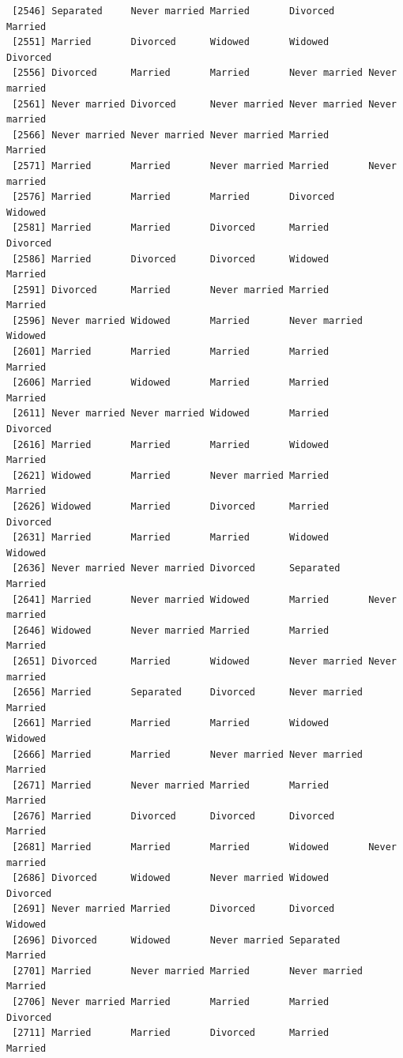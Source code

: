 \documentclass[
  letterpaper,
  DIV=11,
  numbers=noendperiod,
  oneside]{scrartcl}
\begin{document}
\begin{verbatim}
 [2546] Separated     Never married Married       Divorced      Married      
 [2551] Married       Divorced      Widowed       Widowed       Divorced     
 [2556] Divorced      Married       Married       Never married Never married
 [2561] Never married Divorced      Never married Never married Never married
 [2566] Never married Never married Never married Married       Married      
 [2571] Married       Married       Never married Married       Never married
 [2576] Married       Married       Married       Divorced      Widowed      
 [2581] Married       Married       Divorced      Married       Divorced     
 [2586] Married       Divorced      Divorced      Widowed       Married      
 [2591] Divorced      Married       Never married Married       Married      
 [2596] Never married Widowed       Married       Never married Widowed      
 [2601] Married       Married       Married       Married       Married      
 [2606] Married       Widowed       Married       Married       Married      
 [2611] Never married Never married Widowed       Married       Divorced     
 [2616] Married       Married       Married       Widowed       Married      
 [2621] Widowed       Married       Never married Married       Married      
 [2626] Widowed       Married       Divorced      Married       Divorced     
 [2631] Married       Married       Married       Widowed       Widowed      
 [2636] Never married Never married Divorced      Separated     Married      
 [2641] Married       Never married Widowed       Married       Never married
 [2646] Widowed       Never married Married       Married       Married      
 [2651] Divorced      Married       Widowed       Never married Never married
 [2656] Married       Separated     Divorced      Never married Married      
 [2661] Married       Married       Married       Widowed       Widowed      
 [2666] Married       Married       Never married Never married Married      
 [2671] Married       Never married Married       Married       Married      
 [2676] Married       Divorced      Divorced      Divorced      Married      
 [2681] Married       Married       Married       Widowed       Never married
 [2686] Divorced      Widowed       Never married Widowed       Divorced     
 [2691] Never married Married       Divorced      Divorced      Widowed      
 [2696] Divorced      Widowed       Never married Separated     Married      
 [2701] Married       Never married Married       Never married Married      
 [2706] Never married Married       Married       Married       Divorced     
 [2711] Married       Married       Divorced      Married       Married      

\end{verbatim}
\end{document}
